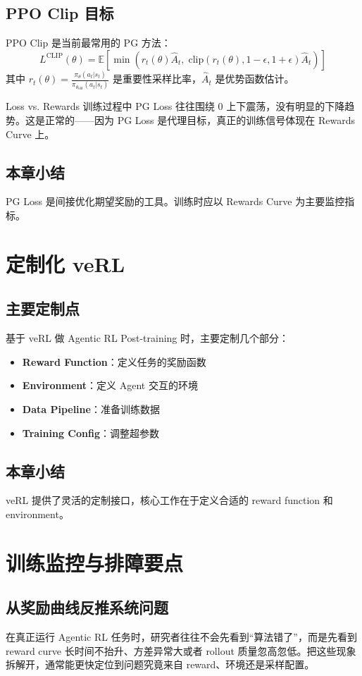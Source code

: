 \documentclass[a4paper]{article}
\begin{document}
\subsection{PPO Clip 目标}
PPO Clip 是当前最常用的 PG 方法：
$$L^{\text{CLIP}}(\theta) = \mathbb{E}\left[\min\left(r_t(\theta) \hat{A}_t, \; \text{clip}(r_t(\theta), 1-\epsilon, 1+\epsilon) \hat{A}_t\right)\right]$$
其中 $r_t(\theta) = \frac{\pi_\theta(a_t|s_t)}{\pi_{\theta_{\text{old}}}(a_t|s_t)}$ 是重要性采样比率，$\hat{A}_t$ 是优势函数估计。

\begin{warningbox}{Loss vs. Rewards}
训练过程中 PG Loss 往往围绕 0 上下震荡，没有明显的下降趋势。这是正常的——因为 PG Loss 是代理目标，真正的训练信号体现在 Rewards Curve 上。
\end{warningbox}

\subsection{本章小结}
PG Loss 是间接优化期望奖励的工具。训练时应以 Rewards Curve 为主要监控指标。

\section{定制化 veRL}
\subsection{主要定制点}
基于 veRL 做 Agentic RL Post-training 时，主要定制几个部分：
\begin{itemize}
  \item \textbf{Reward Function}：定义任务的奖励函数
  \item \textbf{Environment}：定义 Agent 交互的环境
  \item \textbf{Data Pipeline}：准备训练数据
  \item \textbf{Training Config}：调整超参数
\end{itemize}

\subsection{本章小结}
veRL 提供了灵活的定制接口，核心工作在于定义合适的 reward function 和 environment。

\section{训练监控与排障要点}
\subsection{从奖励曲线反推系统问题}
在真正运行 Agentic RL 任务时，研究者往往不会先看到“算法错了”，而是先看到 reward curve 长时间不抬升、方差异常大或者 rollout 质量忽高忽低。把这些现象拆解开，通常能更快定位到问题究竟来自 reward、环境还是采样配置。
\end{document}
